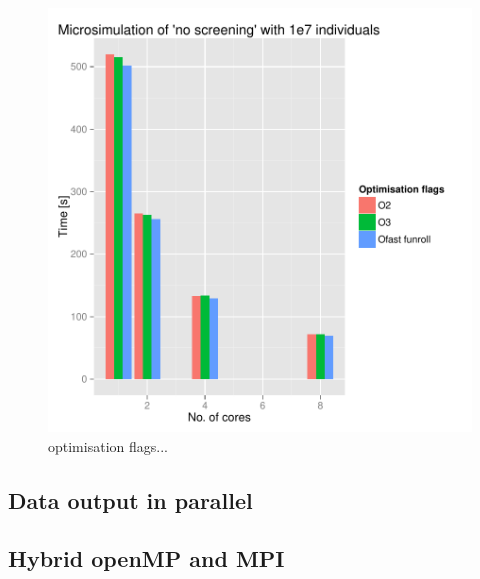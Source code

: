 \begin{figure}[!htbp]
  \centering
  \includegraphics[height=0.85\textheight]{images/flagsProfiling.pdf}
  \caption{optimisation flags...}
  \label{fig:flagScaling}
\end{figure}

\subsection{Data output in parallel}


\subsection{Hybrid openMP and MPI}


